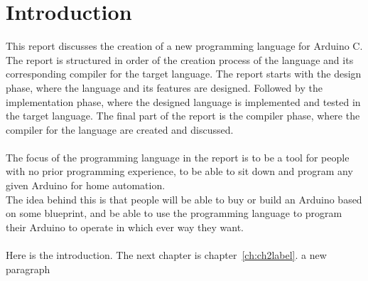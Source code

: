 \chapter{Introduction}\label{ch:introduction}
This report discusses the creation of a new programming language for Arduino C.\\
The report is structured in order of the creation process of the language and its corresponding compiler for the target language. The report starts with the design phase, where the language and its features are designed. Followed by the implementation phase, where the designed language is implemented and tested in the target language. The final part of the report is the compiler phase, where the compiler for the language are created and discussed.
\\\\
The focus of the programming language in the report is to be a tool for people with no prior programming experience, to be able to sit down and program any given Arduino for home automation.\\
The idea behind this is that people will be able to buy or build an Arduino based on some blueprint, and be able to use the programming language to program their Arduino to operate in which ever way they want.
\\\\





Here is the introduction. The next chapter is chapter~\ref{ch:ch2label}.
a new paragraph


